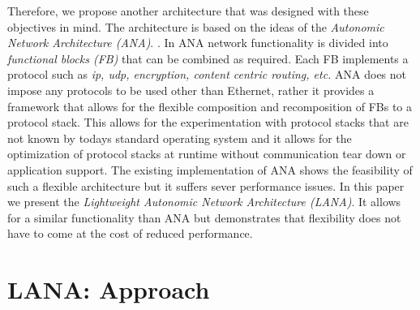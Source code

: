 \documentclass{sig-alternate}
\newcommand{\wolfgang}[1]{\textcolor{blue}{\emph{WM: #1}}}
\begin{document}
Therefore, we propose another architecture that was designed with these objectives in mind.
The architecture is based on the ideas of the \textit{Autonomic Network Architecture (ANA)}. \cite{ANAJournal}. In ANA network functionality is divided into \textit{functional blocks (FB)} that can be combined as required. Each FB implements a protocol such as \textit{ip, udp, encryption, content centric routing, etc.} ANA does not impose any protocols to be used other than Ethernet, rather it provides a framework that allows for the flexible composition and recomposition of FBs to a protocol stack. This allows for the experimentation with protocol stacks that are not known by todays standard operating system and it allows for the optimization of protocol stacks at runtime without communication tear down or application support.
The existing implementation of ANA shows the feasibility of such a flexible architecture but it suffers sever performance issues. 
In this paper we present the \textit{Lightweight Autonomic Network Architecture (LANA)}. It allows for a similar functionality than ANA but demonstrates that flexibility does not have to come at the cost of reduced performance.



\section{LANA: Approach}



\end{document}
